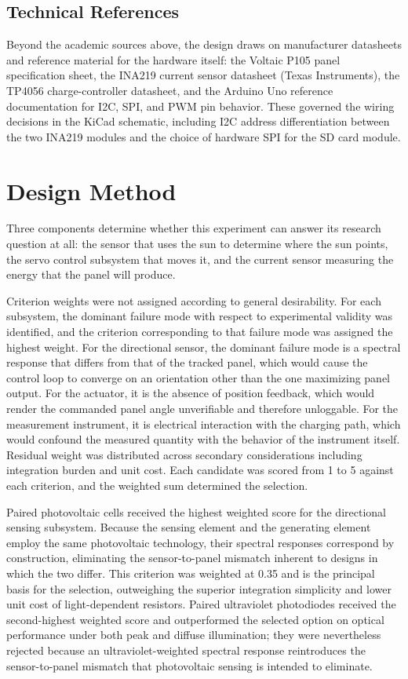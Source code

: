 \documentclass[journal]{IEEEtran}
\begin{document}
\subsection{Technical References}

Beyond the academic sources above, the design draws on manufacturer datasheets and
reference material for the hardware itself: the Voltaic P105 panel specification sheet,
the INA219 current sensor datasheet (Texas Instruments), the TP4056 charge-controller
datasheet, and the Arduino Uno reference documentation for I2C, SPI, and PWM pin
behavior. These governed the wiring decisions in the KiCad schematic, including I2C
address differentiation between the two INA219 modules and the choice of hardware SPI
for the SD card module.

\section{Design Method}

Three components determine whether this experiment can answer its research question at
all: the sensor that uses the sun to determine where the sun points, the servo control
subsystem that moves it, and the current sensor measuring the energy that the panel
will produce.

Criterion weights were not assigned according to general desirability. For each
subsystem, the dominant failure mode with respect to experimental validity was
identified, and the criterion corresponding to that failure mode was assigned the
highest weight. For the directional sensor, the dominant failure mode is a spectral
response that differs from that of the tracked panel, which would cause the control
loop to converge on an orientation other than the one maximizing panel output. For the
actuator, it is the absence of position feedback, which would render the commanded panel
angle unverifiable and therefore unloggable. For the measurement instrument, it is
electrical interaction with the charging path, which would confound the measured
quantity with the behavior of the instrument itself. Residual weight was distributed
across secondary considerations including integration burden and unit cost. Each
candidate was scored from 1 to 5 against each criterion, and the weighted sum
determined the selection.

Paired photovoltaic cells received the highest weighted score for the directional
sensing subsystem. Because the sensing element and the generating element employ the
same photovoltaic technology, their spectral responses correspond by construction,
eliminating the sensor-to-panel mismatch inherent to designs in which the two differ.
This criterion was weighted at 0.35 and is the principal basis for the selection,
outweighing the superior integration simplicity and lower unit cost of light-dependent
resistors. Paired ultraviolet photodiodes received the second-highest weighted score
and outperformed the selected option on optical performance under both peak and diffuse
illumination; they were nevertheless rejected because an ultraviolet-weighted spectral
response reintroduces the sensor-to-panel mismatch that photovoltaic sensing is
intended to eliminate.
\end{document}
